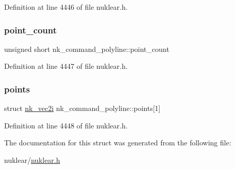 Definition at line 4446 of file nuklear.\+h.

\mbox{\label{structnk__command__polyline_accef2f25308202055403979b4b8a0deb}} 
\subsubsection{\texorpdfstring{point\+\_\+count}{point\_count}}
{\footnotesize\ttfamily unsigned short nk\+\_\+command\+\_\+polyline\+::point\+\_\+count}



Definition at line 4447 of file nuklear.\+h.

\mbox{\label{structnk__command__polyline_a7a12da93e13f22c6286c0e3f608170b5}} 
\subsubsection{\texorpdfstring{points}{points}}
{\footnotesize\ttfamily struct \mbox{\hyperlink{structnk__vec2i}{nk\+\_\+vec2i}} nk\+\_\+command\+\_\+polyline\+::points\mbox{[}1\mbox{]}}



Definition at line 4448 of file nuklear.\+h.



The documentation for this struct was generated from the following file\+:\begin{DoxyCompactItemize}
\item 
nuklear/\mbox{\hyperlink{nuklear_8h}{nuklear.\+h}}\end{DoxyCompactItemize}
